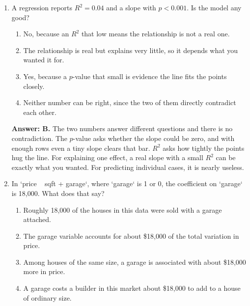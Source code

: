 \documentclass[11pt]{article}
\begin{document}
\begin{enumerate}[itemsep=14pt]
\vspace{2pt}
\textbf{Answer: D.} Squaring is the reason a few far-off points can drag the line toward themselves. A point twice as far away contributes four times as much to the total being minimized, so outliers get a vote out of proportion to their number. Worth remembering before you trust a fit on skewed data.
\vspace{4pt}

\item A regression reports $R^2 = 0.04$ and a slope with $p < 0.001$. Is the model any good?

\begin{enumerate}[label=\Alph*., itemsep=1pt, topsep=3pt]
  \item No, because an $R^2$ that low means the relationship is not a real one.
  \item The relationship is real but explains very little, so it depends what you wanted it for.
  \item Yes, because a $p$-value that small is evidence the line fits the points closely.
  \item Neither number can be right, since the two of them directly contradict each other.
\end{enumerate}

\vspace{2pt}
\textbf{Answer: B.} The two numbers answer different questions and there is no contradiction. The $p$-value asks whether the slope could be zero, and with enough rows even a tiny slope clears that bar. $R^2$ asks how tightly the points hug the line. For explaining one effect, a real slope with a small $R^2$ can be exactly what you wanted. For predicting individual cases, it is nearly useless.
\vspace{4pt}

\item In `price ~ sqft + garage`, where `garage` is 1 or 0, the coefficient on `garage` is 18,000. What does that say?

\begin{enumerate}[label=\Alph*., itemsep=1pt, topsep=3pt]
  \item Roughly 18,000 of the houses in this data were sold with a garage attached.
  \item The garage variable accounts for about \$18,000 of the total variation in price.
  \item Among houses of the same size, a garage is associated with about \$18,000 more in price.
  \item A garage costs a builder in this market about \$18,000 to add to a house of ordinary size.
\end{enumerate}


\end{enumerate}
\end{document}
